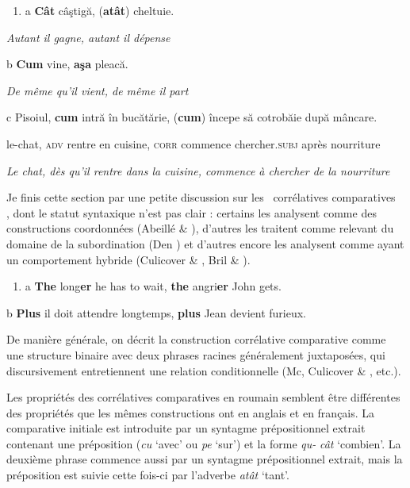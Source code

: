 \begin{enumerate}
\item \label{bkm:Ref301516573}a  \textbf{Cât} câştigă, (\textbf{atât}) cheltuie.


\end{enumerate}
{\itshape
Autant il gagne, autant il dépense}

  b  \textbf{Cum} vine, \textbf{aşa} pleacă.

{\itshape
De même qu'il vient, de même il part} 

  c  Pisoiul, \textbf{cum} intră în bucătărie, (\textbf{cum}) începe să cotrobăie după mâncare.

    le-chat, \textsc{adv} rentre en cuisine, \textsc{corr} commence chercher.\textsc{subj} après nourriture

{\itshape
Le chat, dès qu'il rentre dans la cuisine, commence à chercher de la nourriture}

Je finis cette section par une petite discussion sur les {\guillemotleft}~corrélatives comparatives~{\guillemotright} , dont le statut syntaxique n'est pas clair : certains les analysent comme des constructions coordonnées (Abeillé \& \citet{Borsley2006}), d'autres les traitent comme relevant du domaine de la subordination (Den \citet{Dikken2005}) et d'autres encore les analysent comme ayant un comportement hybride (Culicover \& \citet{Jackendoff2005}, Bril \& \citet{Rebuschi2006}). 


\begin{enumerate}
\item \label{bkm:Ref301516794}a  \textbf{The} long\textbf{er} he has to wait, \textbf{the} angri\textbf{er} John gets.


\end{enumerate}
  b  \textbf{Plus} il doit attendre longtemps, \textbf{plus} Jean devient furieux.

De manière générale, on décrit la construction corrélative comparative comme une structure binaire avec deux phrases racines généralement juxtaposées, qui discursivement entretiennent une relation conditionnelle (Mc\citet{Cawley1988}, Culicover \& \citet{Jackendoff2005}, etc.).

Les propriétés des corrélatives comparatives en roumain semblent être différentes des propriétés que les mêmes constructions ont en anglais et en français. La comparative initiale est introduite par un syntagme prépositionnel extrait contenant une préposition (\textit{cu} `avec' ou \textit{pe} `sur') et la forme \textit{qu-} \textit{cât} `combien'. La deuxième phrase commence aussi par un syntagme prépositionnel extrait, mais la préposition est suivie cette fois-ci par l'adverbe \textit{atât} `tant'.


